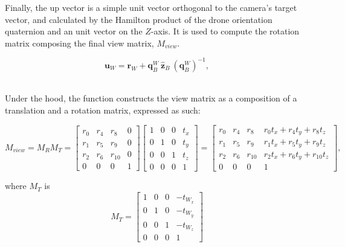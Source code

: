 Finally, the up vector is a simple unit vector orthogonal to the camera's
target vector, and calculated by the Hamilton product of the drone orientation
quaternion and an unit vector on the $Z$-axis. It is used to compute the
rotation matrix composing the final view matrix, $M_{view}$.

\begin{equation} \label{equ:upvector}
	\mathbf{u}_W = \mathbf{r}_W + \mathbf{q}_B^W \:\mathbf{\hat{z}}_B\:
	(\mathbf{q}_B^W)^{-1},
\end{equation}

~\\Under the hood, the  function constructs the view matrix
as a composition of a translation and a rotation matrix, expressed as such:

\begin{equation} \label{equ:viewmatrix}
	M_{view} = M_R M_T = \begin{bmatrix}
							r_0 & r_4 & r_8 & 0\\
							r_1 & r_5 & r_9 & 0\\
							r_2 & r_6 & r_10 & 0\\
							0 & 0 & 0 & 1
						\end{bmatrix}
						\begin{bmatrix}
							1 & 0 & 0 & t_x\\
							0 & 1 & 0 & t_y\\
							0 & 0 & 1 & t_z\\
							0 & 0 & 0 & 1
						\end{bmatrix}
					=
						\begin{bmatrix}
							r_0 & r_4 & r_8 & r_0 t_x + r_4 t_y + r_8 t_z\\
							r_1 & r_5 & r_9 & r_1 t_x + r_5 t_y + r_9 t_z\\
							r_2 & r_6 & r_10 & r_2 t_x + r_6 t_y + r_10 t_z\\
							0 & 0 & 0 & 1
						\end{bmatrix},
\end{equation}

where $M_T$ is
\begin{equation}
	M_T = \begin{bmatrix}
			1 & 0 & 0 & -t_W_x\\
			0 & 1 & 0 & -t_W_y\\
			0 & 0 & 1 & -t_W_z\\
			0 & 0 & 0 & 1
		\end{bmatrix}
\end{equation}

